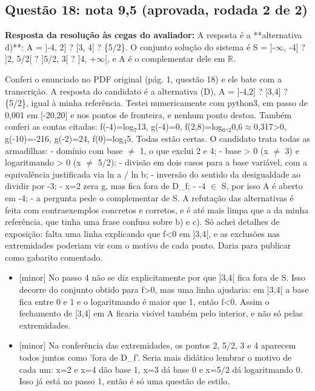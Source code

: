 \documentclass{article}%
\begin{document}
\subsection*{Questão 18: nota 9,5 (aprovada, rodada 2 de 2)}%
\textbf{Resposta da resolução às cegas do avaliador:} A resposta é a **alternativa d)**: A = {]}-4, 2{]} ? {[}3, 4{]} ? \{5/2\}.\newline%
\newline%
O conjunto solução do sistema é S = {]}-$\infty$, -4{]} ? {]}2, 5/2{[} ? {]}5/2, 3{[} ? {]}4, +$\infty${[}, e A é o complementar dele em $\mathbb{R}$.\par %
Conferi o enunciado no PDF original (pág. 1, questão 18) e ele bate com a transcrição. A resposta do candidato é a alternativa (D), A = {]}-4,2{]} ? {[}3,4{]} ? \{5/2\}, igual à minha referência. Testei numericamente com python3, em passo de 0,001 em {[}-20,20{]} e nos pontos de fronteira, e nenhum ponto destoa. Também conferi as contas citadas: f(-4)=log$_{7}$13, g(-4)=0, f(2,8)=log$_{0}$,$_{2}$0,6$\approx$0,317>0, g(-10)=-216, g(-2)=24, f(0)=log$_{3}$5. Todas estão certas.\newline%
\newline%
O candidato trata todas as armadilhas:\newline%
{-} domínio com base $\neq$ 1, o que exclui 2 e 4;\newline%
{-} base > 0 (x $\neq$ 3) e logaritmando > 0 (x $\neq$ 5/2);\newline%
{-} divisão em dois casos para a base variável, com a equivalência justificada via ln a / ln b;\newline%
{-} inversão do sentido da desigualdade ao dividir por -3;\newline%
{-} x=2 zera g, mas fica fora de D\_f;\newline%
{-} -4 $\in$ S, por isso A é aberto em -4;\newline%
{-} a pergunta pede o complementar de S.\newline%
\newline%
A refutação das alternativas é feita com contraexemplos concretos e corretos, e é até mais limpa que a da minha referência, que tinha uma frase confusa sobre b) e c). Só achei detalhes de exposição: falta uma linha explicando que f<0 em {]}3,4{[}, e as exclusões nas extremidades poderiam vir com o motivo de cada ponto. Daria para publicar como gabarito comentado.%
\begin{itemize}%
\item%
{[}minor{]} No passo 4 não se diz explicitamente por que {]}3,4{[} fica fora de S. Isso decorre do conjunto obtido para f>0, mas uma linha ajudaria: em {]}3,4{[} a base fica entre 0 e 1 e o logaritmando é maior que 1, então f<0. Assim o fechamento de {[}3,4{]} em A ficaria visível também pelo interior, e não só pelas extremidades.%
\item%
{[}minor{]} Na conferência das extremidades, os pontos 2, 5/2, 3 e 4 aparecem todos juntos como 'fora de D\_f'. Seria mais didático lembrar o motivo de cada um: x=2 e x=4 dão base 1, x=3 dá base 0 e x=5/2 dá logaritmando 0. Isso já está no passo 1, então é só uma questão de estilo.%
\end{itemize}%
\end{document}
